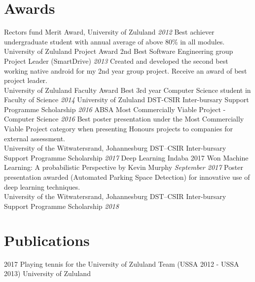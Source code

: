 \documentclass[letterpaper]{moderncv}        %
\begin{document}
				\section{Awards}
				\cventry
				{Rector\textquotesingle{}s fund}
				{Merit Award, University of Zululand}
				{}
				{\textit{2012}}
				{}
				{Best achiever undergraduate student with annual average of above 80\% in all modules.\\University of Zululand}
				\vspace{1mm}
				\cventry
				{Project Award}
				{2nd Best Software Engineering group Project Leader (SmartDrive)}
				{}
				{\textit{2013}}
				{}
				{Created and developed the second best working native android for my 2nd year group project. Receive an award of best project leader.\\University of Zululand}
				\vspace{1mm}
				\cventry
				{Faculty Award}
				{Best 3rd year Computer Science student in Faculty of Science}
				{}
				{\textit{2014}}
				{}
				{University of Zululand}
				\vspace{1mm}
				\cventry
				{DST-CSIR}
				{Inter-bursary Support Programme Scholarship}
				{}
				{\textit{2016}}
				{}
				{}
				\vspace{1mm}
				\cventry
				{ABSA}
				{Most Commercially Viable Project - Computer Science}
				{}
				{\textit{2016}}
				{}
				{Best poster presentation under the Most Commercially Viable Project category when presenting Honours projects to companies for external assessment.\\University of the Witwatersrand, Johannesburg}
				\vspace{1mm}
				\cventry
				{DST–CSIR}
				{Inter-bursary Support Programme Scholarship}
				{}
				{\textit{2017}}
				{}
				{}
				\vspace{1mm}
				\cventry
				{Deep Learning Indaba 2017}
				{Won \textquotesingle{}Machine Learning: A probabilistic Perspective by Kevin Murphy\textquotesingle{}}
				{}
				{\textit{September 2017}}
				{}
				{Poster presentation awarded (Automated Parking Space Detection) for innovative use of deep learning techniques.\\University of the Witwatersrand, Johannesburg}
				\vspace{1mm}
				\cventry
				{DST–CSIR}
				{Inter-bursary Support Programme Scholarship}
				{}
				{\textit{2018}}
				{}
				{}
				\vspace{1mm}
				
\section{Publications}
\cventry
{2017}
{Playing tennis for the University of Zululand Team (USSA 2012 - USSA 2013)}
{University of Zululand}
{}
{\textit{}}
{}
				
\end{document}
